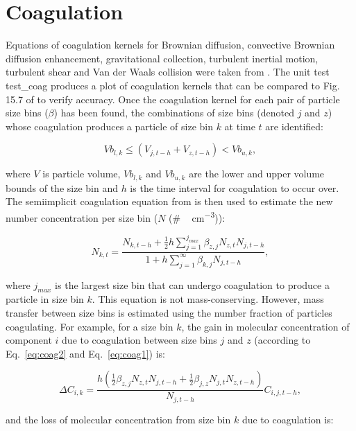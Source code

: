 \documentclass[gmd, manuscript]{copernicus}
\begin{document}
\section{Coagulation}\label{sec:coag}

Equations of coagulation kernels for Brownian diffusion, convective Brownian diffusion enhancement, gravitational collection, turbulent inertial motion, turbulent shear and Van der Waals collision were taken from \citet{Jacobson2005}.  The unit test test\_coag produces a plot of coagulation kernels that can be compared to Fig. 15.7 of \citet{Jacobson2005} to verify accuracy.  Once the coagulation kernel for each pair of particle size bins ($\beta$) has been found, the combinations of size bins (denoted $j$ and $z$) whose coagulation produces a particle of size bin $k$ at time $t$ are identified:

 \begin{equation} \label{eq:coag2}
Vb_{l,k} \leq (V_{j,t-h}+V_{z,t-h}) < Vb_{u,k},
\end{equation}

where $V$ is particle volume, $Vb_{l,k}$ and $Vb_{u,k}$ are the lower and upper volume bounds of the size bin and $h$ is the time interval for coagulation to occur over.  The semiimplicit coagulation equation from \citet{Jacobson2005} is then used to estimate the new number concentration per size bin ($N$ (\unit{\#\, cm^{-3}})):

\begin{equation} \label{eq:coag1}
N_{k,t} = \frac{N_{k,t-h}+\frac{1}{2}h\sum_{j=1}^{j_{max}}\beta_{z,j}N_{z,t}N_{j,t-h}}{1+h\sum_{j=1}^{\infty}\beta_{k,j}N_{j,t-h}},
\end{equation}

where $j_{max}$ is the largest size bin that can undergo coagulation to produce a particle in size bin $k$.  This equation is not mass-conserving.  However, mass transfer between size bins is estimated using the number fraction of particles coagulating.  For example, for a size bin $k$, the gain in molecular concentration of component $i$ due to coagulation between size bins $j$ and $z$ (according to Eq.~\ref{eq:coag2} and Eq.~\ref{eq:coag1}) is:

\begin{equation} \label{eq:coag3}
\Delta C_{i,k} = \frac{h(\frac{1}{2}\beta_{z,j}N_{z,t}N_{j,t-h}+\frac{1}{2}\beta_{j,z}N_{j,t}N_{z,t-h})}{N_{j,t-h}}C_{i,j,t-h},
\end{equation}

and the loss of molecular concentration from size bin $k$ due to coagulation is:
\end{document}
